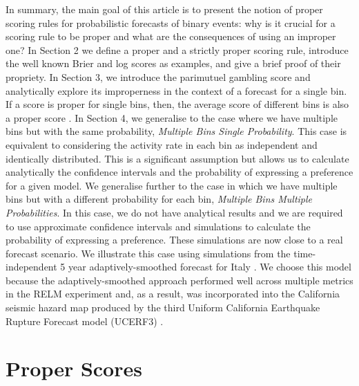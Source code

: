 \documentclass[referee,sn-basic]{sn-jnl}
\theoremstyle{thmstyleone}%
\theoremstyle{thmstyletwo}%
\theoremstyle{thmstylethree}%
\begin{document}
In summary, the main goal of this article is to present the notion of proper scoring rules for probabilistic forecasts of binary events: why is it crucial for a scoring rule to be proper and what are the consequences of using an improper one? In Section 2 we define a proper and a strictly proper scoring rule, introduce the well known Brier and log scores as examples, and give a brief proof of their propriety. In Section 3, we introduce the parimutuel gambling score and analytically explore its improperness in the context of a forecast for a single bin. If a score is proper for single bins, then, the average score of different bins is also a proper score \citep{gneiting2007strictly}. In Section 4, we generalise to the case where we have multiple bins but with the same probability, \emph{Multiple Bins Single Probability}. This case is equivalent to considering the activity rate in each bin as independent and identically distributed. This is a significant assumption but allows us to calculate analytically the confidence intervals and the probability of expressing a preference for a given model. We generalise further to the case in which we have multiple bins but with a different probability for each bin, \emph{Multiple Bins Multiple Probabilities}. In this case, we do not have analytical results and we are required to use approximate confidence intervals and simulations to calculate the probability of expressing a preference. These simulations are now close to a real forecast scenario. We illustrate this case using simulations from  the time-independent 5 year adaptively-smoothed forecast for Italy \citep{werner2010adaptively}. We choose this model because the adaptively-smoothed approach performed well across multiple metrics in the RELM experiment \citep{zechar2013regional} and, as a result, was incorporated into the California seismic hazard map produced by the third Uniform California Earthquake Rupture Forecast model (UCERF3) \citep{field2014uniform}. 

\section{Proper Scores}
\label{sec:properscores}
\end{document}
